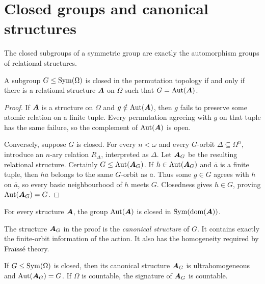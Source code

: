 \section{Closed groups and canonical structures}

The closed subgroups of a symmetric group are exactly the automorphism groups
of relational structures.

\begin{theorem}
    \label{thm:closed-subgroups-automorphism-groups}
    A subgroup \(G\leq\operatorname{Sym}(\Omega)\) is closed in the permutation topology if
    and only if there is a relational structure \(\boldsymbol{A}\) on \(\Omega\) such that
    \(G=\operatorname{Aut}(\boldsymbol{A})\).
\end{theorem}

\begin{proof}
    If \(\boldsymbol{A}\) is a structure on \(\Omega\) and \(g\notin\operatorname{Aut}(\boldsymbol{A})\), then \(g\)
    fails to preserve some atomic relation on a finite tuple.  Every
    permutation agreeing with \(g\) on that tuple has the same failure, so the
    complement of \(\operatorname{Aut}(\boldsymbol{A})\) is open.

    Conversely, suppose \(G\) is closed.  For every \(n<\omega\) and every
    \(G\)-orbit \(\Delta\subseteq\Omega^n\), introduce an \(n\)-ary relation
    \(R_\Delta\), interpreted as \(\Delta\).  Let \(\boldsymbol{A}_G\) be the resulting
    relational structure.  Certainly \(G\leq\operatorname{Aut}(\boldsymbol{A}_G)\).  If
    \(h\in\operatorname{Aut}(\boldsymbol{A}_G)\) and \(\bar a\) is a finite tuple, then \(h\bar a\)
    belongs to the same \(G\)-orbit as \(\bar a\).  Thus some \(g\in G\)
    agrees with \(h\) on \(\bar a\), so every basic neighbourhood of \(h\)
    meets \(G\).  Closedness gives \(h\in G\), proving
    \(\operatorname{Aut}(\boldsymbol{A}_G)=G\).
\end{proof}

\begin{corollary}
    \label{cor:automorphism-groups-are-closed}
    For every structure \(\boldsymbol{A}\), the group \(\operatorname{Aut}(\boldsymbol{A})\) is closed in
    \(\operatorname{Sym}(\operatorname{dom}(\boldsymbol{A}))\).
\end{corollary}

The structure \(\boldsymbol{A}_G\) in the proof is the \emph{canonical structure} of \(G\).
It contains exactly the finite-orbit information of the action.  It also has
the homogeneity required by Fraïssé theory.

\begin{proposition}
    \label{prop:canonical-structure-ultrahomogeneous}
    If \(G\leq\operatorname{Sym}(\Omega)\) is closed, then its canonical structure \(\boldsymbol{A}_G\)
    is ultrahomogeneous and \(\operatorname{Aut}(\boldsymbol{A}_G)=G\).  If \(\Omega\) is countable, the
    signature of \(\boldsymbol{A}_G\) is countable.
\end{proposition}

